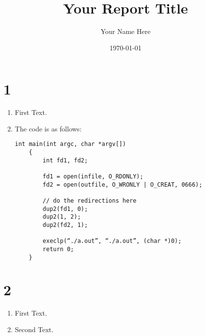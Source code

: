 \documentclass[12pt,a4paper]{article}
\begin{document}
\title{Your Report Title}
\author{Your Name Here}
\date{\today}
\maketitle

\section*{1}

\begin{enumerate}[label=(\alph*)]
    \item
          First Text.
    \item The code is as follows:
          \begin{lstlisting}[title=Code]
    int main(int argc, char *argv[])
    {
        int fd1, fd2;

        fd1 = open(infile, O_RDONLY);
        fd2 = open(outfile, O_WRONLY | O_CREAT, 0666);
        
        // do the redirections here
        dup2(fd1, 0);
        dup2(1, 2);
        dup2(fd2, 1);

        execlp(“./a.out”, “./a.out”, (char *)0);
        return 0;
    }
    \end{lstlisting}
\end{enumerate}

\section*{2}

\begin{enumerate}[label=(\alph*)]
    \item
          First Text.
    \item
          Second Text.
\end{enumerate}
\end{document}
